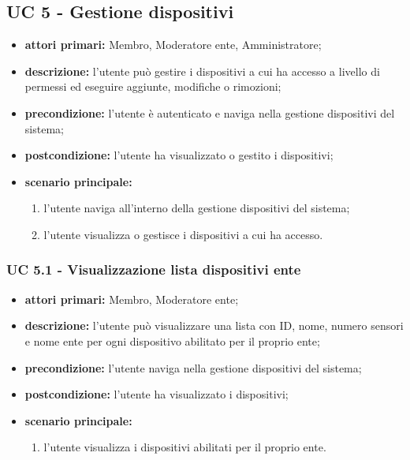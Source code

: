 	\subsection{UC 5 - Gestione dispositivi}
		
		\begin{itemize}
			\item \textbf{attori primari:} Membro, Moderatore ente, Amministratore;
			\item \textbf{descrizione:} l'utente può gestire i dispositivi a cui ha accesso a livello di permessi ed eseguire aggiunte, modifiche o rimozioni;
			\item \textbf{precondizione:} l'utente è autenticato e naviga nella gestione dispositivi del sistema;
			\item \textbf{postcondizione:} l'utente ha visualizzato o gestito i dispositivi;
			\item \textbf{scenario principale:}
			\begin{enumerate}
				\item{l'utente naviga all'interno della gestione dispositivi del sistema;}
				\item{l'utente visualizza o gestisce i dispositivi a cui ha accesso.}
			\end{enumerate}
		\end{itemize}
			
			
			\subsubsection{UC 5.1 - Visualizzazione lista dispositivi ente}
			\begin{itemize}
				\item \textbf{attori primari:} Membro, Moderatore ente;
				\item \textbf{descrizione:} l'utente può visualizzare una lista con ID, nome, numero sensori e nome ente per ogni dispositivo abilitato per il proprio ente;
				\item \textbf{precondizione:} l'utente naviga nella gestione dispositivi del sistema;
				\item \textbf{postcondizione:} l'utente ha visualizzato i dispositivi;
				\item \textbf{scenario principale:}
				\begin{enumerate}
					\item{l'utente visualizza i dispositivi abilitati per il proprio ente.}
				\end{enumerate}
			\end{itemize}
			
